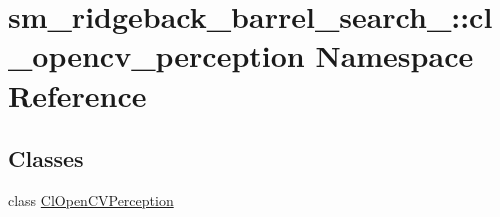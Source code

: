 \hypertarget{namespacesm__ridgeback__barrel__search__2_1_1cl__opencv__perception}{}\section{sm\+\_\+ridgeback\+\_\+barrel\+\_\+search\+\_\+:\+:cl\+\_\+opencv\+\_\+perception Namespace Reference}
\label{namespacesm__ridgeback__barrel__search__2_1_1cl__opencv__perception}
\subsection*{Classes}
\begin{DoxyCompactItemize}
\item 
class \hyperlink{classsm__ridgeback__barrel__search__2_1_1cl__opencv__perception_1_1ClOpenCVPerception}{Cl\+Open\+C\+V\+Perception}
\end{DoxyCompactItemize}
